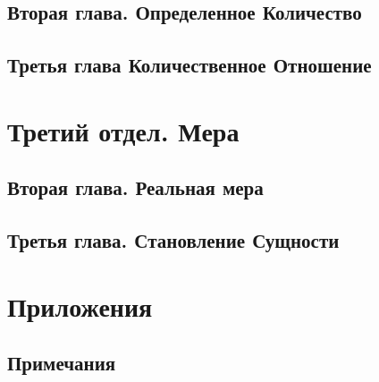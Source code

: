 \documentclass[b5paper, 11pt, twoside, onecolumn, openany]{memoir}
\begin{document}
\chapter[{\em Вторая глава} Определенное Количество]{Вторая глава. Определенное Количество}


\chapter[Третья глава Количественное Отношение]{Третья глава Количественное Отношение}



\part[{\em Третий отдел} МEРА]{Третий отдел. Мера}


\chapter[{\em Вторая глава} Реальная мера]{Вторая глава. Реальная мера}


\chapter[{\em Третья глава} Становление Сущности]{Третья глава. Становление Сущности}


\backmatter

\part[ПРИЛОЖЕНИЯ]{Приложения}


\chapter[Примечания]{Примечания}



\clearpage
\tableofcontents*
\clearpage
\end{document}
